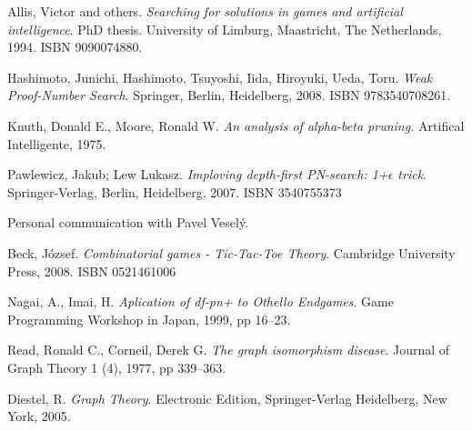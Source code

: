 
\def\bibname{Bibliography}
\begin{thebibliography}{99}
\addcontentsline{toc}{chapter}{\bibname}


  {\sc Allis,} Victor and others.
  \emph{Searching for solutions in games and artificial intelligence}.
  PhD thesis.
  University of Limburg, Maastricht, The Netherlands, 1994.
  ISBN 9090074880.

  {\sc Hashimoto,} Junichi, {\sc Hashimoto,} Tsuyoshi, {\sc Iida,} Hiroyuki, {\sc Ueda,} Toru.
  \emph{Weak Proof-Number Search}.
  Springer, Berlin, Heidelberg, 2008.
  ISBN 9783540708261.

  {\sc Knuth,} Donald E., {\sc Moore,} Ronald W.
  \emph{An analysis of alpha-beta pruning.}
  Artifical Intelligente, 1975.

  {\sc Pawlewicz,} Jakub; {\sc Lew} Lukasz.
  \emph{Imploving depth-first PN-search: 1+$\epsilon$ trick}.
  Springer-Verlag, Berlin, Heidelberg, 2007.
  ISBN 3540755373
   

  Personal communication with Pavel Veselý.

  {\sc Beck,} József.
  \emph{Combinatorial games - Tic-Tac-Toe Theory}.
  Cambridge University Press, 2008.
  ISBN 0521461006

  {\sc Nagai,} A., {\sc Imai,} H.
  \emph{Aplication of df-pn+ to Othello Endgames}.
  Game Programming Workshop in Japan, 1999, pp 16--23.


  {\sc Read,} Ronald C., {\sc Corneil,} Derek G.
  \emph{The graph isomorphism disease}.
  Journal of Graph Theory 1 (4), 1977, pp 339--363.

  {\sc Diestel,} R.
  \emph{Graph Theory}.
  Electronic Edition, Springer-Verlag Heidelberg, New York, 2005.

\end{thebibliography}
